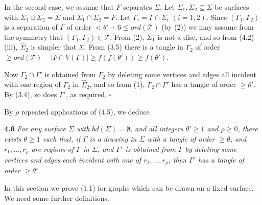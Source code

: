 In the second case, we assume that $F$ separates $\Sigma$. Let $\Sigma_1, \Sigma_2 \subseteq \Sigma$ be surfaces with $\Sigma_1 \cup \Sigma_2 = \Sigma$ and $\Sigma_1 \cap \Sigma_2 = F$. Let $\Gamma_i = \Gamma \cap \Sigma_i$ $(i = 1, 2)$. Since $(\Gamma_1, \Gamma_2)$ is a separation of $\Gamma$ of order $< \theta' + 6 \le ord(\mathcal{T})$ (by (2)) we may assume from the symmetry that $(\Gamma_1, \Gamma_2) \in \mathcal{T}$. From (2), $\Sigma_1$ is not a disc, and so from (4.2)(iii), $\hat{\Sigma}_2$ is simpler that $\Sigma$. From (3.5) there is a tangle in $\Gamma_2$ of order $\ge ord(\mathcal{T}) - |F \cap V(\Gamma)| \ge f(f(\theta')) \ge f(\theta')$.

Now $\Gamma_2 \cap \Gamma'$ is obtained from $\Gamma_2$ by deleting some vertices and edges all incident with one region of $\Gamma_2$ in $\hat{\Sigma}_2$, and so from (1), $\Gamma_2 \cap \Gamma'$ has a tangle of order $\ge \theta'$. By (3.4), so does $\Gamma'$, as required. $\square$

By $\rho$ repeated applications of (4.5), we deduce

\textbf{4.6} \textit{For any surface $\Sigma$ with $bd(\Sigma) = \emptyset$, and all integers $\theta' \ge 1$ and $\rho \ge 0$, there exists $\theta \ge 1$ such that, if $\Gamma$ is a drawing in $\Sigma$ with a tangle of order $\ge \theta$, and $r_1, \dots, r_\rho$ are regions of $\Gamma$ in $\Sigma$, and $\Gamma'$ is obtained from $\Gamma$ by deleting some vertices and edges each incident with one of $r_1, \dots, r_\rho$, then $\Gamma'$ has a tangle of order $\ge \theta'$.}


In this section we prove (1.1) for graphs which can be drawn on a fixed surface. We need some further definitions.

